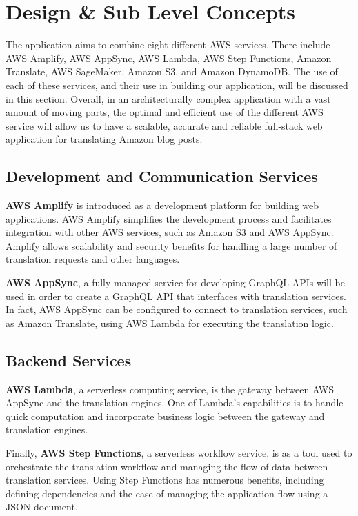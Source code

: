 \section{Design \& Sub Level Concepts}

\indent \indent The application aims to combine eight different AWS services. There include AWS Amplify, AWS AppSync, AWS Lambda, AWS Step Functions, Amazon Translate, AWS SageMaker, Amazon S3, and Amazon DynamoDB. The use of each of these services, and their use in building our application, will be discussed in this section. Overall, in an architecturally complex application with a vast amount of moving parts, the optimal and efficient use of the different AWS service will allow us to have a scalable, accurate and reliable full-stack web application for translating Amazon blog posts.

\subsection{Development and Communication Services}
\textbf{AWS Amplify} is introduced as a development platform for building web applications. AWS Amplify simplifies the development process and facilitates integration with other AWS services, such as Amazon S3 and AWS AppSync. Amplify  allows scalability and security benefits for handling a large number of translation requests and other languages.

\textbf{AWS AppSync}, a fully managed service for developing GraphQL APIs will be used in order to create a GraphQL API that interfaces with translation services. In fact, AWS AppSync can be configured to connect to translation services, such as Amazon Translate, using AWS Lambda for executing the translation logic.

\subsection{Backend Services}
\textbf{AWS Lambda}, a serverless computing service, is the gateway between AWS AppSync and the translation engines. One of Lambda's capabilities is to handle quick computation and incorporate business logic between the gateway and translation engines.

Finally, \textbf{AWS Step Functions}, a serverless workflow service, is as a tool used to orchestrate the translation workflow and managing the flow of data between translation services. Using Step Functions has numerous benefits, including defining dependencies and the ease of managing the application flow using a JSON document.

